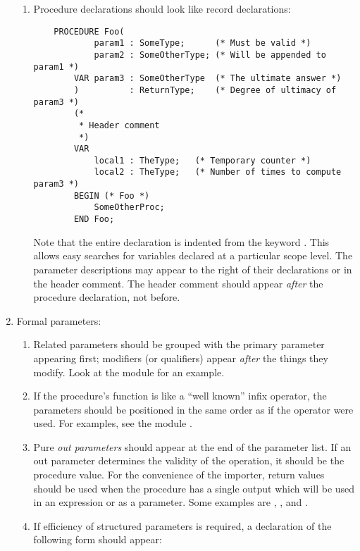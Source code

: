 \begin{enumerate}
\begin{enumerate}
    \item
        Procedure declarations should look like record declarations:
        \begin{verbatim}
    PROCEDURE Foo(
            param1 : SomeType;      (* Must be valid *)
            param2 : SomeOtherType; (* Will be appended to param1 *)
        VAR param3 : SomeOtherType  (* The ultimate answer *)
        )          : ReturnType;    (* Degree of ultimacy of param3 *)
        (*
         * Header comment
         *)
        VAR
            local1 : TheType;   (* Temporary counter *)
            local2 : TheType;   (* Number of times to compute param3 *)
        BEGIN (* Foo *)
            SomeOtherProc;
        END Foo;
        \end{verbatim}
        Note that the entire declaration is indented from the keyword 
        .  This allows easy searches for variables
        declared at a particular scope level.   The parameter descriptions
	may appear to the right of their declarations or in the header comment.
	The header comment should appear {\em after} the procedure declaration,
	not before.
    \end{enumerate}
\item
    Formal parameters:
    \begin{enumerate}
    \item 
        Related parameters should be grouped with the primary parameter
        appearing first; modifiers (or qualifiers) appear
	{\em after} the things
        they modify.  Look at the module  for an example.
    \item
        If the procedure's function is like a ``well known'' infix operator,
        the parameters should be positioned in the same order as if the
        operator were used.  For examples, see the module .
    \item
        Pure {\em out parameters} should appear at the end of the parameter
        list.  If an out parameter determines the validity of the operation,
        it should be the procedure  value.  For the
	convenience of the importer, return values should be used when
	the procedure has a single output which will be
	used in an expression or as a parameter.  Some examples are
	, , and
	.
    \item
        If efficiency of structured parameters is required, a
        declaration of the following form should appear:
        \begin{verbatim}

\end{verbatim}
\end{enumerate}
\end{enumerate}
